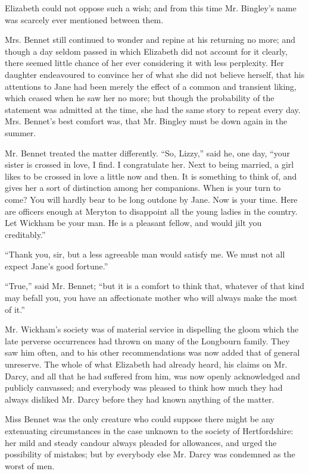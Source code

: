 \documentclass[10pt]{book}
\begin{document}
   Elizabeth could not oppose such a wish; and from this time Mr. Bingley’s
name was scarcely ever mentioned between them.
  

   Mrs. Bennet still continued to wonder and repine at his returning no
more; and though a day seldom passed in which Elizabeth did not account
for it clearly, there seemed little chance of her ever considering it
with less perplexity. Her daughter endeavoured to convince her of what
she did not believe herself, that his attentions to Jane had been merely
the effect of a common and transient liking, which ceased when he saw
her no more; but though the probability of the statement was admitted at
the time, she had the same story to repeat every day. Mrs. Bennet’s best
comfort was, that Mr. Bingley must be down again in the summer.
  

   Mr. Bennet treated the matter differently. “So, Lizzy,” said he, one
day, “your sister is crossed in love, I find. I congratulate her. Next
to being married, a girl likes to
   be crossed in love a little now and
then. It is something to think of, and gives her a sort of distinction
among her companions. When is your turn to come? You will hardly bear to
be long outdone by Jane. Now is your time. Here are officers enough at
Meryton to disappoint all the young ladies in the country. Let Wickham
be your man. He is a pleasant fellow, and would jilt you creditably.”
  

   “Thank you, sir, but a less agreeable man would satisfy me. We must not
all expect Jane’s good fortune.”
  

   “True,” said Mr. Bennet; “but it is a comfort to think that, whatever of
that kind may befall you, you have an affectionate mother who will
always make the most of it.”
  

   Mr. Wickham’s society was of material service in dispelling the gloom
which the late perverse occurrences had thrown on many of the Longbourn
family. They saw him often, and to his other recommendations was now
added that of general unreserve. The whole of what Elizabeth had already
heard, his claims on Mr. Darcy, and all that he had suffered from him,
was now openly acknowledged and publicly canvassed; and everybody was
pleased to think how much they had always disliked Mr. Darcy before they
had known anything of the matter.
  

   Miss Bennet was the only creature who could suppose there might be any
extenuating circumstances in the case unknown to the society of
Hertfordshire: her mild and steady candour always pleaded for
allowances, and urged the possibility of mistakes; but by everybody else
Mr. Darcy was condemned as the worst of men.
  
\end{document}

